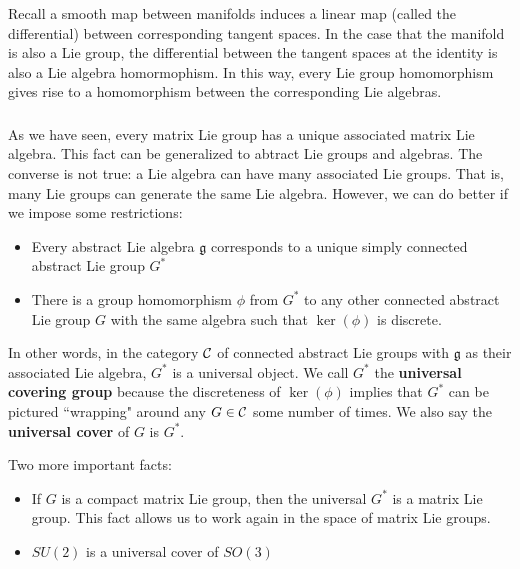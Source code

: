 \subsubsection{}
Recall a smooth map between manifolds induces a linear map (called the differential) between corresponding tangent spaces. In the case that the manifold is also a Lie group, the differential between the tangent spaces at the identity is also a Lie algebra homormophism. In this way, every Lie group homomorphism gives rise to a homomorphism between the corresponding Lie algebras.

\subsubsection{}
As we have seen, every matrix Lie group has a unique associated matrix Lie algebra. This fact can be generalized to abtract Lie groups and algebras. The converse is not true: a Lie algebra can have many associated Lie groups. That is, many Lie groups can generate the same Lie algebra. However, we can do better if we impose some restrictions:
\begin{itemize}
    \item Every abstract Lie algebra $\mathfrak g$ corresponds to a unique simply connected abstract Lie group $G^*$
    \item There is a group homomorphism $\phi$ from $G^*$ to any other connected abstract Lie group $G$ with the same algebra such that $\ker(\phi)$ is discrete.
\end{itemize}
In other words, in the category ${\mathcal C}$ of connected abstract Lie groups with $\mathfrak g$ as their associated Lie algebra, $G^*$ is a universal object. We call $G^*$ the \textbf{universal covering group} because the discreteness of $\ker(\phi)$ implies that $G^*$ can be pictured ``wrapping" around any $G \in {\mathcal C}$ some number of times. We also say the \textbf{universal cover} of $G$ is $G^*$.

Two more important facts:
\begin{itemize}
    \item If $G$ is a compact matrix Lie group, then the universal $G^*$ is a matrix Lie group. This fact allows us to work again in the space of matrix Lie groups.
    \item $SU(2)$ is a universal cover of $SO(3)$
\end{itemize}
